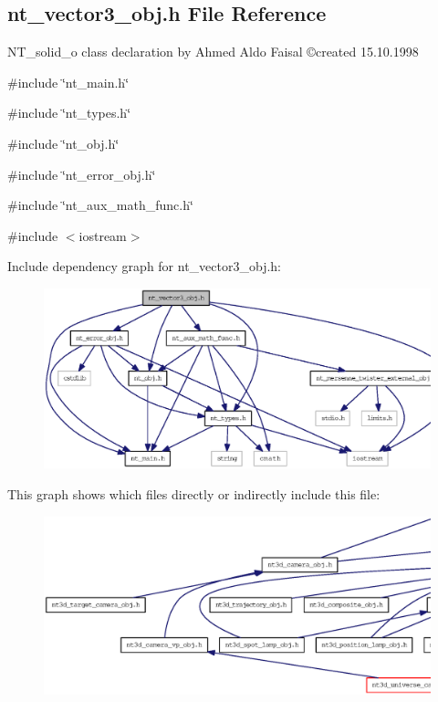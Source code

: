 \subsection{nt\_\-vector3\_\-obj.h File Reference}
\label{nt__vector3__obj_8h}



\begin{DoxyItemize}
\item NT\_\-solid\_\-o class declaration by Ahmed Aldo Faisal \copyright created 15.10.1998 
\end{DoxyItemize} 


{\ttfamily \#include \char`\"{}nt\_\-main.h\char`\"{}}\par
{\ttfamily \#include \char`\"{}nt\_\-types.h\char`\"{}}\par
{\ttfamily \#include \char`\"{}nt\_\-obj.h\char`\"{}}\par
{\ttfamily \#include \char`\"{}nt\_\-error\_\-obj.h\char`\"{}}\par
{\ttfamily \#include \char`\"{}nt\_\-aux\_\-math\_\-func.h\char`\"{}}\par
{\ttfamily \#include $<$iostream$>$}\par
Include dependency graph for nt\_\-vector3\_\-obj.h:
\nopagebreak
\begin{figure}[H]
\begin{center}
\leavevmode
\includegraphics[width=400pt]{nt__vector3__obj_8h__incl}
\end{center}
\end{figure}
This graph shows which files directly or indirectly include this file:
\nopagebreak
\begin{figure}[H]
\begin{center}
\leavevmode
\includegraphics[width=400pt]{nt__vector3__obj_8h__dep__incl}
\end{center}
\end{figure}
